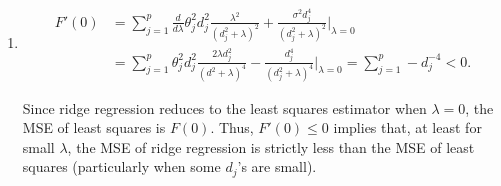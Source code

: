 \documentclass[11pt]{article}
\begin{document}
\begin{enumerate}
\begin{enumerate}
\item
\begin{align*}
F'(0)
 &  = \sum_{j = 1}^p \frac{d}{d\lambda}
        \theta_j^2d_j^2 \frac{\lambda^2}{(d_j^2 + \lambda)^2}
        + \frac{\sigma^2d_j^4}{(d_j^2 + \lambda)^2} \bigg|_{\lambda = 0}    \\
 &  = \sum_{j = 1}^p
        \theta_j^2d_j^2 \frac{2\lambda d_j^2}{(d^2 + \lambda)^4}
        - \frac{d_j^4}{(d_j^2 + \lambda)^4} \bigg|_{\lambda = 0}
    = \sum_{j = 1}^p -d_j^{-4} < 0.
\end{align*}

Since ridge regression reduces to the least squares estimator when
$\lambda = 0$, the MSE of least squares is $F(0)$. Thus, $F'(0) \leq 0$ implies
that, at least for small $\lambda$, the MSE of ridge regression is strictly
less than the MSE of least squares (particularly when some $d_j$'s are small).

\end{enumerate}

\end{enumerate}
\end{document}
